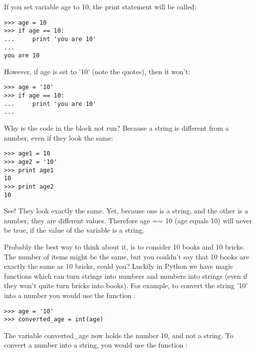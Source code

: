 If you set variable age to 10, the print statement will be called:

\begin{listing}
\begin{verbatim}
>>> age = 10
>>> if age == 10:
...     print 'you are 10'
...
you are 10
\end{verbatim}
\end{listing}

However, if age is set to '10' (note the quotes), then it won't:

\begin{listing}
\begin{verbatim}
>>> age = '10'
>>> if age == 10:
...     print 'you are 10'
...
\end{verbatim}
\end{listing}

Why is the code in the block not run?  Because a string is different from a number, even if they look the same:

\begin{listing}
\begin{verbatim}
>>> age1 = 10
>>> age2 = '10'
>>> print age1
10
>>> print age2
10
\end{verbatim}
\end{listing}

See!  They look exactly the same.  Yet, because one is a string, and the other is a number, they are different values. Therefore age == 10 (age equals 10) will never be true, if the value of the variable is a string.
\par
Probably the best way to think about it, is to consider 10 books and 10 bricks.  The number of items might be the same, but you couldn't say that 10 books are exactly the same as 10 bricks, could you? Luckily in Python we have magic functions which can turn strings into numbers and numbers into strings (even if they won't quite turn bricks into books). For example, to convert the string '10' into a number you would use the function :

\begin{listing}
\begin{verbatim}
>>> age = '10'
>>> converted_age = int(age)
\end{verbatim}
\end{listing}

\noindent
The variable converted\_age now holds the number 10, and not a string. To convert a number into a string, you would use the function :

